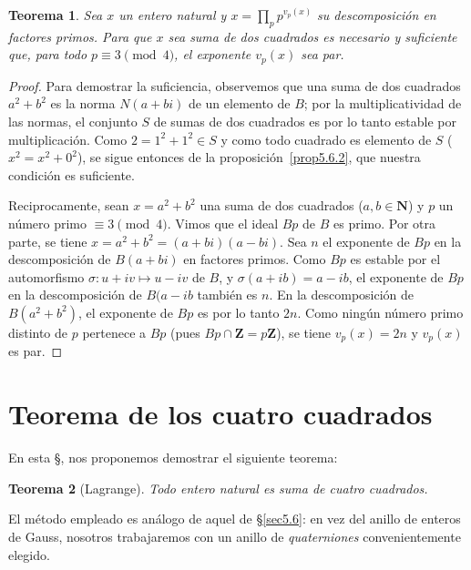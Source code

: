 \documentclass[10pt,oneside,bibtotoc,smallheadings,leqno,a5paper,DIV=12]{scrbook}
\newcommand{\ZZ}{\mathbf{Z}}
\newcommand{\NN}{\mathbf{N}}
\newcommand{\QED}{}%
\numberwithin{equation}{section}
\theoremstyle{defi}
\theoremstyle{enonce}
\newtheorem{theorem}{Teorema}
\theoremstyle{rem}
\numberwithin{theorem}{section}
\numberwithin{proposition}{section}
\numberwithin{definition}{section}
\numberwithin{lemma}{section}
\numberwithin{corollary}{section}
\numberwithin{example}{section}
\numberwithin{footnote}{section}%
\begin{document}
\begin{theorem}
Sea $x$ un entero natural y $x = \prod_{p}p^{v_{p}(x)}$ su descomposici\'on en factores primos. Para que $x$
sea suma de dos cuadrados es necesario y suficiente que, para todo $p\equiv 3\pmod 4$, el exponente
$v_{p}(x)$ sea par.
\end{theorem}

\begin{proof}
Para demostrar la suficiencia, observemos que una suma de dos cuadrados $a^{2}+b^{2}$ es la norma
$N(a+bi)$ de un elemento de $B$; por la multiplicatividad de las normas, el conjunto $S$ de sumas de dos
cuadrados es por lo tanto estable por multiplicaci\'on. Como $2 = 1^{2}+1^{2}\in S$ y como todo cuadrado
es elemento de $S$ ($x^{2}=x^{2}+0^{2}$), se sigue entonces de la
proposici\'on~\ref{prop5.6.2}, que nuestra condici\'on es suficiente.

Reciprocamente, sean $x=a^{2}+b^{2}$ una suma de dos cuadrados ($a,b\in\NN$) y $p$ un n\'umero primo
$\equiv 3\pmod 4$. Vimos que el ideal $Bp$ de $B$ es primo. Por otra parte, se tiene
$x = a^{2}+b^{2}=(a+bi)(a-bi)$. Sea $n$ el exponente de $Bp$ en la descomposici\'on de $B(a+bi)$ en factores
primos. Como $Bp$ es estable por el automorfismo $\sigma:u+iv\mapsto u-iv$ de $B$, y $\sigma(a+ib)=a-ib$,
el exponente de $Bp$ en la descomposici\'on de $B(a-ib$ tambi\'en es $n$. En la descomposici\'on de
$B(a^{2}+b^{2})$, el exponente de $Bp$ es por lo tanto $2n$. Como ning\'un n\'umero primo distinto de
$p$ pertenece a $Bp$ (pues $Bp\cap\ZZ = p\ZZ$), se tiene $v_{p}(x) = 2n$ y $v_{p}(x)$ es par. \QED
\end{proof}

\section{Teorema de los cuatro cuadrados}\label{sec5.7}

En esta \S, nos proponemos demostrar el siguiente teorema:

\begin{theorem}[Lagrange]\label{teo5.7.1}
Todo entero natural es suma de cuatro cuadrados.
\end{theorem}

El m\'etodo empleado es an\'alogo de aquel de \S\ref{sec5.6}: en vez del anillo de enteros de Gauss, nosotros
trabajaremos con un anillo de {\em quaterniones} convenientemente elegido.
\end{document}
